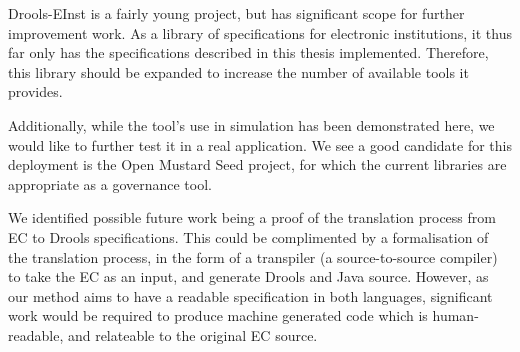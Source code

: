 Drools-EInst is a fairly young project, but has significant scope for further
improvement work. As a library of specifications for electronic institutions,
it thus far only has the specifications described in this thesis implemented.
Therefore, this library should be expanded to increase the number of available
tools it provides.

Additionally, while the tool's use in simulation has been demonstrated here,
we would like to further test it in a real application. We see a good candidate for
this deployment is the Open Mustard Seed project, for which the current
libraries are appropriate as a governance tool.

We identified possible future work being a proof of the translation process
from \ac{EC} to Drools specifications. This could be complimented by a
formalisation of the translation process, in the form of a transpiler (a
source-to-source compiler) to take the \ac{EC} as an input, and generate
Drools and Java source. However, as our method aims to have a readable
specification in both languages, significant work would be required to produce
machine generated code which is human-readable, and relateable to the original
\ac{EC} source.

